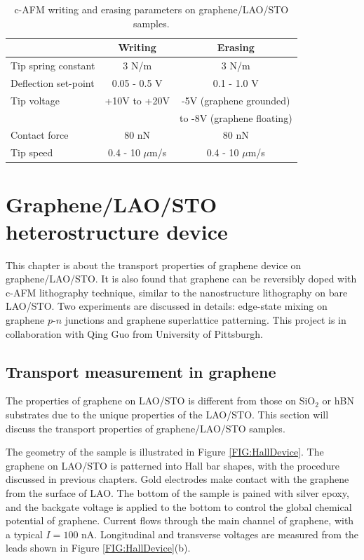 \documentclass[pdflatex, sectionletters, 12pt]{pittetd}    %
\begin{document}
\begin{table}[h!]
	\centering
	\begin{tabular}{l|cc}
		\hline
		&    Writing    &    Erasing \\ \hline
		Tip spring constant    &    3 N/m    & 3 N/m    \\ 
		Deflection set-point    &    0.05 - 0.5 V    &    0.1 - 1.0 V    \\    
		Tip voltage    &    +10V to +20V    & -5V (graphene grounded) \\
		&    & to -8V (graphene floating) \\
		Contact force    &    80 nN    &    80 nN    \\
		Tip speed    &    0.4 - 10 $\mu$m/s    &    0.4 - 10 $\mu$m/s \\ 
	\end{tabular}
	\caption{c-AFM writing and erasing parameters on graphene/LAO/STO samples.}
	\label{TAB:GCOLithography}
	
\end{table}

\chapter{Graphene/LAO/STO heterostructure device}
\label{SEC:GCO}

This chapter is about the transport properties of graphene device on graphene/LAO/STO. It is also found that graphene can be reversibly doped with c-AFM lithography technique, similar to the nanostructure lithography on bare LAO/STO. Two experiments are discussed in details: edge-state mixing on graphene $p$-$n$ junctions and graphene superlattice patterning. This project is in collaboration with Qing Guo from University of Pittsburgh.

\section{Transport measurement in graphene}

The properties of graphene on LAO/STO is different from those on SiO$_2$ or hBN substrates due to the unique properties of the LAO/STO. This section will discuss the transport properties of graphene/LAO/STO samples. 

The geometry of the sample is illustrated in Figure \ref{FIG:HallDevice}. The graphene on LAO/STO is patterned into Hall bar shapes, with the procedure discussed in previous chapters. Gold electrodes make contact with the graphene from the surface of LAO. The bottom of the sample is pained with silver epoxy, and the backgate voltage is applied to the bottom to control the global chemical potential of graphene. Current flows through the main channel of graphene, with a typical $I = 100$ nA. Longitudinal and transverse voltages are measured from the leads shown in Figure \ref{FIG:HallDevice}(b).
\end{document}

